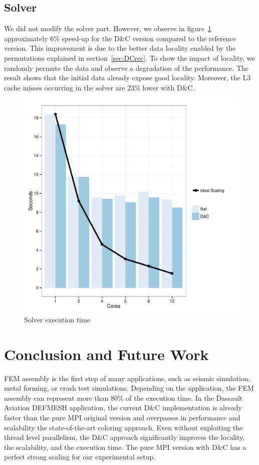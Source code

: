 \documentclass{IOS-Book-Article}
\begin{document}
\subsection{Solver}
We did not modify the solver part. However, we observe in figure~\ref{fig:solCurves} approximately 6\% speed-up for the D\&C version compared to the reference version.
This improvement is due to the better data locality enabled by the permutations explained in section~\ref{sec:DCrec}.
To show the impact of locality, we randomly permute the data and observe a degradation of the performance.
The result shows that the initial data already expose good locality.
Moreover, the L3 cache misses occurring in the solver are 23\% lower with D\&C.

\begin{figure}[htp]
 \centering
 \includegraphics[scale=0.3]{Laplacian_solver_time.pdf}
 \caption{Solver execution time}
 \label{fig:solCurves}
\end{figure}

\section{Conclusion and Future Work}
FEM assembly is the first step of many applications, such as seismic simulation, metal forming, or crash test simulations.
Depending on the application, the FEM assembly can represent more than 80\% of the execution time.
In the Dassault Aviation DEFMESH application, the current D\&C implementation is already faster than the pure MPI original version and overpasses in performance and scalability the state-of-the-art coloring approach. Even without exploiting the thread level parallelism, the D\&C approach  significantly improves the locality, the scalability, and the execution time.
The pure MPI version with D\&C has a perfect strong scaling for our experimental setup.
\end{document}
